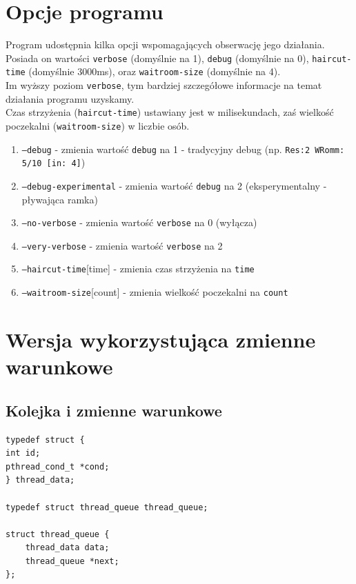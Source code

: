 \documentclass[12pt,a4paper]{article}
\begin{document}
	\section{Opcje programu}
	Program udostępnia kilka opcji wspomagających obserwację jego
	działania. Posiada on wartości \texttt{verbose} (domyślnie na 1), 
	\texttt{debug} (domyślnie na 0), \texttt{haircut-time} (domyślnie
	3000ms), oraz \texttt{waitroom-size} (domyślnie na 4). \\
	Im wyższy poziom \texttt{verbose}, tym bardziej szczegółowe 
	informacje na temat działania programu uzyskamy. \\
	Czas strzyżenia (\texttt{haircut-time}) ustawiany jest w 
	milisekundach, zaś wielkość poczekalni (\texttt{waitroom-size}) w
	liczbie osób.
	\begin{enumerate}
		\item \texttt{--debug} - zmienia wartość \texttt{debug} na 1 - 
			tradycyjny debug (np. \texttt{Res:2 WRomm: 5/10 [in: 4]})
		\item \texttt{--debug-experimental} - zmienia wartość
			\texttt{debug} na 2 (eksperymentalny - pływająca ramka)
		\item \texttt{--no-verbose} - zmienia wartość \texttt{verbose}
			na 0 (wyłącza)
		\item \texttt{--very-verbose} - zmienia wartość \texttt{verbose}
			na 2
		\item \texttt{--haircut-time}[time] - zmienia czas strzyżenia na
			\texttt{time}
		\item \texttt{--waitroom-size}[count] - zmienia wielkość
			poczekalni na \texttt{count}
	\end{enumerate}
	
	\section{Wersja wykorzystująca zmienne warunkowe}
	\subsection{Kolejka i zmienne warunkowe}
	
	\begin{center}
		\begin{minipage}{0.8\linewidth}
\begin{lstlisting}[caption = Struktura reprezentująca kolejkę.]
typedef struct {
int id;
pthread_cond_t *cond;
} thread_data;

typedef struct thread_queue thread_queue;

struct thread_queue {
    thread_data data;
    thread_queue *next;
};
\end{lstlisting}
		\end{minipage}
	\end{center}
		
\end{document}
